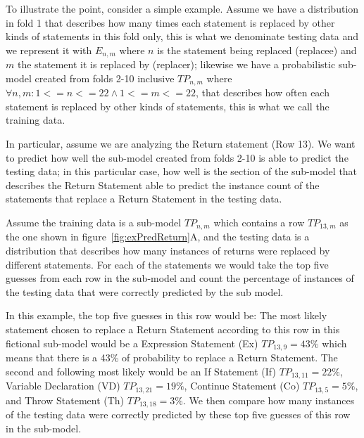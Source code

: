 \documentclass[conference]{IEEEtran}
\begin{document}
To illustrate the point, consider a simple example. Assume we have a 
distribution in fold 1 that describes how many times each statement is replaced 
by other kinds of statements in this fold 
only, this is what we denominate testing data and we represent it with $E_{n,m}$ 
where $n$ is the statement being replaced (replacee) and $m$ the statement it is 
replaced by (replacer); likewise we have a probabilistic sub-model created from 
folds 2-10 inclusive $TP_{n,m}$ where $\forall n,m: 1<=n<=22 \land 1<=m<=22$, 
that describes how often each statement is replaced by 
other kinds of statements, this is what we call the training data. 

In 
particular, assume we are analyzing the Return statement (Row 13). We want to 
predict 
how well the sub-model created from folds 2-10 is able to predict the testing 
data; in this particular case, how well is the section of the sub-model that 
describes the Return Statement able to predict the instance count of the 
statements that replace a Return Statement in the testing data.

Assume the training data is a sub-model $TP_{n,m}$ which contains a row 
$TP_{13,m}$ as the one shown in figure~\ref{fig:exPredReturn}A, and the testing data is a distribution that describes 
how many instances of returns were replaced by different statements.
For each of the statements we would take the top five guesses from each row in 
the sub-model and count the percentage of instances of the testing data that were correctly 
predicted by the sub model. 

In this example, the top five guesses in this row would be: The most 
likely statement chosen to replace a Return Statement according to this row in 
this fictional sub-model would be a Expression Statement (Ex) $TP_{13,9} = 43\%$ 
which means that there is a 43\% of probability to replace a Return Statement. 
The second and following most likely would be an If Statement (If) $TP_{13,11} = 22\%$, Variable Declaration (VD)  $TP_{13,21} = 19\%$, 
Continue Statement (Co)  $TP_{13,5} = 5\%$, and Throw Statement (Th) $TP_{13,18} = 3\%$. We then compare how many instances of the testing data were correctly predicted 
by these top five guesses of this row in the sub-model. 
\end{document}
